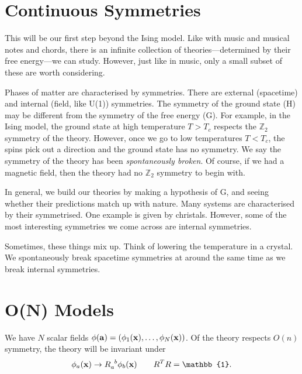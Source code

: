 
\section{Continuous Symmetries}%
\label{sec:continuous_symmetries}

This will be our first step beyond the Ising model. 
Like with music and musical notes and chords, there is an infinite collection of theories---determined by their free energy---we can study. However, just like in music, only a small subset of these are worth considering.

Phases of matter are characterised by symmetries.
There are external (spacetime) and internal (field, like U(1)) symmetries.
The symmetry of the ground state (H) may be different from the symmetry of the free energy (G).
For example, in the Ising model, the ground state at high temperature $T > T_c$ respects the $\mathbb{Z}_2$ symmetry of the theory. However, once we go to low temperatures $T < T_c$, the spins pick out a direction and the ground state has no symmetry. We say the symmetry of the theory has been \emph{spontaneously broken}.
Of course, if we had a magnetic field, then the theory had no $\mathbb{Z}_2$ symmetry to begin with.

In general, we build our theories by making a hypothesis of G, and seeing whether their predictions match up with nature.
Many systems are characterised by their symmetrised. One example is given by christals. However, some of the most interesting symmetries we come across are internal symmetries.
\begin{leftbar}
  \begin{remark}
    Sometimes, these things mix up. Think of lowering the temperature in a crystal. We spontaneously break spacetime symmetries at around the same time as we break internal symmetries. 
  \end{remark}
\end{leftbar}

\section{O(N) Models}%
\label{sec:o_n_models}

We have $N$ scalar fields $\phi(\vb{a}) = (\phi_1(\vb{x}), \dots, \phi_{N}(\vb{x}))$. Of the theory respects $O(n)$ symmetry, the theory will be invariant under 
\begin{equation}
  \phi_a (\vb{x}) \to R \indices{_a^b} \phi_b(\vb{x}) \qquad R ^T R = \mathbb{1}.
\end{equation}

